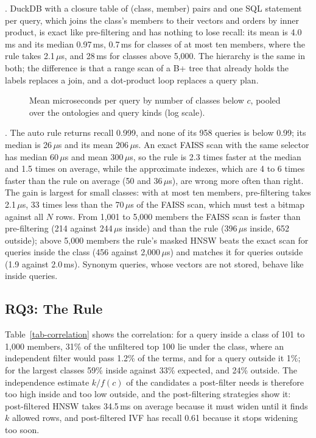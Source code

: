 .
DuckDB with a closure table of (class, member) pairs and one SQL statement per query, which
joins the class's members to their vectors and orders by inner product, is exact like
pre-filtering and has nothing to lose recall: its mean is 4.0\,ms and its median 0.97\,ms,
0.7\,ms for classes of at most ten members, where the rule takes 2.1\,$\mu$s, and 28\,ms
for classes above 5,000.
The hierarchy is the same in both; the difference is that a range scan of a B+ tree that
already holds the labels replaces a join, and a dot-product loop replaces a query plan.
\begin{figure}[t]
\centering

\caption{Mean microseconds per query by number of classes below $c$, pooled over the ontologies and query kinds (log scale).}
\label{fig-latency}
\end{figure}

.
The auto rule returns recall 0.999, and none of its 958 queries is below 0.99; its median
is 26\,$\mu$s and its mean 206\,$\mu$s.
An exact FAISS scan with the same selector has median 60\,$\mu$s and mean 300\,$\mu$s, so
the rule is 2.3 times faster at the median and 1.5 times on average, while the approximate
indexes, which are 4 to 6 times faster than the rule on average (50 and 36\,$\mu$s), are
wrong more often than right.
The gain is largest for small classes: with at most ten members, pre-filtering takes
2.1\,$\mu$s, 33 times less than the 70\,$\mu$s of the FAISS scan, which must test a
bitmap against all $N$ rows.
From 1,001 to 5,000 members the FAISS scan is faster than pre-filtering (214 against
244\,$\mu$s inside) and than the rule (396\,$\mu$s inside, 652 outside);
above 5,000 members the rule's masked HNSW beats the exact scan for queries inside the
class (456 against 2,000\,$\mu$s) and matches it for queries outside (1.9 against 2.0\,ms).
Synonym queries, whose vectors are not stored, behave like inside queries.

\subsection{RQ3: The Rule}

Table~\ref{tab-correlation} shows the correlation: for a query inside a class of 101 to
1,000 members, 31\% of the unfiltered top 100 lie under the class, where an independent
filter would pass 1.2\% of the terms, and for a query outside it 1\%; for the largest
classes 59\% inside against 33\% expected, and 24\% outside.
The independence estimate $k/f(c)$ of the candidates a post-filter needs is therefore too
high inside and too low outside, and the post-filtering strategies show it: post-filtered
HNSW takes 34.5\,ms on average because it must widen until it finds $k$ allowed rows, and
post-filtered IVF has recall 0.61 because it stops widening too soon.

